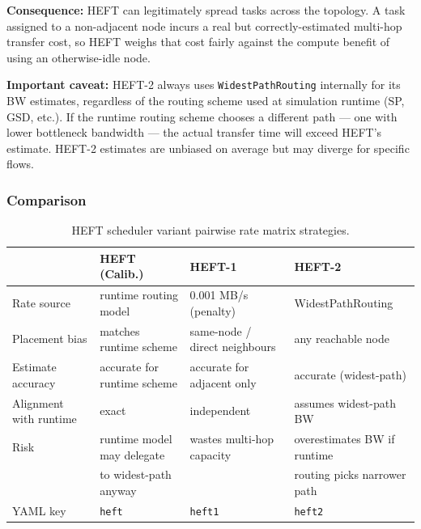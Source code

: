 \documentclass[11pt]{article}
\begin{document}
\medskip
\textbf{Consequence:} HEFT can legitimately spread tasks across the topology.
A task assigned to a non-adjacent node incurs a real but correctly-estimated
multi-hop transfer cost, so HEFT weighs that cost fairly against the compute
benefit of using an otherwise-idle node.

\medskip
\textbf{Important caveat:} HEFT-2 always uses \texttt{WidestPathRouting}
internally for its BW estimates, regardless of the routing scheme used at
simulation runtime (SP, GSD, etc.).  If the runtime routing scheme chooses
a different path --- one with lower bottleneck bandwidth --- the actual
transfer time will exceed HEFT's estimate.  HEFT-2 estimates are unbiased
on average but may diverge for specific flows.

\subsubsection{Comparison}

\begin{table}[ht]
\centering
\small
\begin{tabular}{llll}
\toprule
                          & \textbf{HEFT (Calib.)}        & \textbf{HEFT-1}               & \textbf{HEFT-2} \\
\midrule
Rate source               & runtime routing model         & 0.001 MB/s (penalty)          & WidestPathRouting \\
Placement bias            & matches runtime scheme        & same-node / direct neighbours & any reachable node \\
Estimate accuracy         & accurate for runtime scheme   & accurate for adjacent only    & accurate (widest-path) \\
Alignment with runtime    & exact                         & independent                   & assumes widest-path BW \\
Risk                      & runtime model may delegate    & wastes multi-hop capacity     & overestimates BW if runtime \\
                          & to widest-path anyway         &                               & routing picks narrower path \\
YAML key                  & \texttt{heft}                 & \texttt{heft1}                & \texttt{heft2} \\
\bottomrule
\end{tabular}
\caption{HEFT scheduler variant pairwise rate matrix strategies.}
\end{table}
\end{document}
